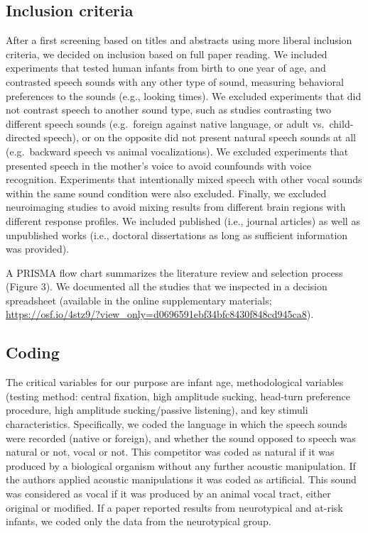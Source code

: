 \documentclass[man]{apa6}
\begin{document}
\hypertarget{inclusion-criteria}{%
\subsection{Inclusion criteria}\label{inclusion-criteria}}

After a first screening based on titles and abstracts using more liberal inclusion criteria, we decided on inclusion based on full paper reading. We included experiments that tested human infants from birth to one year of age, and contrasted speech sounds with any other type of sound, measuring behavioral preferences to the sounds (e.g., looking times). We excluded experiments that did not contrast speech to another sound type, such as studies contrasting two different speech sounds (e.g.~foreign against native language, or adult vs.~child-directed speech), or on the opposite did not present natural speech sounds at all (e.g.~backward speech vs animal vocalizations). We excluded experiments that presented speech in the mother's voice to avoid counfounds with voice recognition. Experiments that intentionally mixed speech with other vocal sounds within the same sound condition were also excluded. Finally, we excluded neuroimaging studies to avoid mixing results from different brain regions with different response profiles. We included published (i.e., journal articles) as well as unpublished works (i.e., doctoral dissertations as long as sufficient information was provided).

A PRISMA flow chart summarizes the literature review and selection process (Figure 3). We documented all the studies that we inspected in a decision spreadsheet (available in the online supplementary materials; \url{https://osf.io/4stz9/?view_only=d0696591ebf34bfc8430f848cd945ca8}).

\hypertarget{coding}{%
\subsection{Coding}\label{coding}}

The critical variables for our purpose are infant age, methodological variables (testing method: central fixation, high amplitude sucking, head-turn preference procedure, high amplitude sucking/passive listening), and key stimuli characteristics. Specifically, we coded the language in which the speech sounds were recorded (native or foreign), and whether the sound opposed to speech was natural or not, vocal or not. This competitor was coded as natural if it was produced by a biological organism without any further acoustic manipulation. If the authors applied acoustic manipulations it was coded as artificial. This sound was considered as vocal if it was produced by an animal vocal tract, either original or modified. If a paper reported results from neurotypical and at-risk infants, we coded only the data from the neurotypical group.
\end{document}
